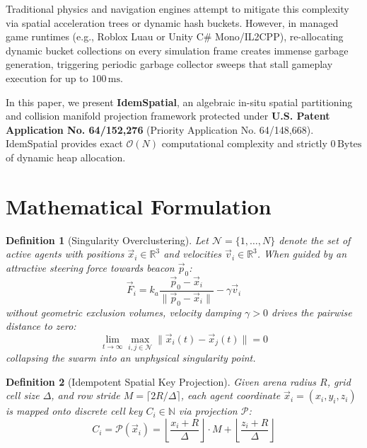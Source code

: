 \documentclass[journal,10pt,twocolumn]{article}
\newtheorem{definition}{Definition}
\begin{document}
Traditional physics and navigation engines attempt to mitigate this complexity via spatial acceleration trees or dynamic hash buckets. However, in managed game runtimes (e.g., Roblox Luau or Unity C\# Mono/IL2CPP), re-allocating dynamic bucket collections on every simulation frame creates immense garbage generation, triggering periodic garbage collector sweeps that stall gameplay execution for up to $100\,\text{ms}$.

In this paper, we present \textbf{IdemSpatial}, an algebraic in-situ spatial partitioning and collision manifold projection framework protected under \textbf{U.S. Patent Application No. 64/152,276} (Priority Application No. 64/148,668). IdemSpatial provides exact $\mathcal{O}(N)$ computational complexity and strictly $0\,\text{Bytes}$ of dynamic heap allocation.

\section{Mathematical Formulation}

\begin{definition}[Singularity Overclustering]
Let $\mathcal{N} = \{1, \dots, N\}$ denote the set of active agents with positions $\vec{x}_i \in \mathbb{R}^3$ and velocities $\vec{v}_i \in \mathbb{R}^3$. When guided by an attractive steering force towards beacon $\vec{p}_0$:
\begin{equation}
\vec{F}_i = k_a \frac{\vec{p}_0 - \vec{x}_i}{\|\vec{p}_0 - \vec{x}_i\|} - \gamma \vec{v}_i
\end{equation}
without geometric exclusion volumes, velocity damping $\gamma > 0$ drives the pairwise distance to zero:
\begin{equation}
\lim_{t \to \infty} \max_{i, j \in \mathcal{N}} \|\vec{x}_i(t) - \vec{x}_j(t)\| = 0
\end{equation}
collapsing the swarm into an unphysical singularity point.
\end{definition}

\begin{definition}[Idempotent Spatial Key Projection]
Given arena radius $R$, grid cell size $\Delta$, and row stride $M = \lceil 2R / \Delta \rceil$, each agent coordinate $\vec{x}_i = (x_i, y_i, z_i)$ is mapped onto discrete cell key $C_i \in \mathbb{N}$ via projection $\mathcal{P}$:
\begin{equation}
C_i = \mathcal{P}(\vec{x}_i) = \left\lfloor \frac{x_i + R}{\Delta} \right\rfloor \cdot M + \left\lfloor \frac{z_i + R}{\Delta} \right\rfloor
\end{equation}
\end{definition}
\end{document}
